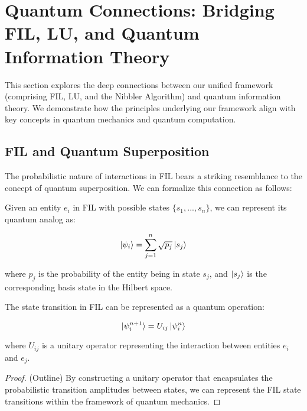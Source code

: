 \section{Quantum Connections: Bridging FIL, LU, and Quantum Information Theory}

This section explores the deep connections between our unified framework (comprising FIL, LU, and the Nibbler Algorithm) and quantum information theory. We demonstrate how the principles underlying our framework align with key concepts in quantum mechanics and quantum computation.

\subsection{FIL and Quantum Superposition}

The probabilistic nature of interactions in FIL bears a striking resemblance to the concept of quantum superposition. We can formalize this connection as follows:

\begin{definition}
Given an entity $e_i$ in FIL with possible states $\{s_1, ..., s_n\}$, we can represent its quantum analog as:

\begin{equation}
\ket{\psi_i} = \sum_{j=1}^n \sqrt{p_j} \ket{s_j}
\end{equation}

where $p_j$ is the probability of the entity being in state $s_j$, and $\ket{s_j}$ is the corresponding basis state in the Hilbert space.
\end{definition}

\begin{theorem}
The state transition in FIL can be represented as a quantum operation:

\begin{equation}
\ket{\psi_i^{n+1}} = U_{ij} \ket{\psi_i^n}
\end{equation}

where $U_{ij}$ is a unitary operator representing the interaction between entities $e_i$ and $e_j$.
\end{theorem}

\begin{proof}
(Outline) By constructing a unitary operator that encapsulates the probabilistic transition amplitudes between states, we can represent the FIL state transitions within the framework of quantum mechanics.
\end{proof}

